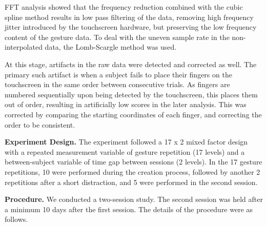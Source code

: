 \documentclass{sig-alternate-10pt}
\begin{document}
FFT analysis showed that the frequency reduction combined with the cubic spline method results in low pass filtering of the data, removing high frequency jitter introduced by the touchscreen hardware, but preserving the low frequency content of the gesture data. To deal with the uneven sample rate in the non-interpolated data, the Lomb-Scargle method was used. 



At this stage, artifacts in the raw data were detected and corrected as well. The primary such artifact is when a subject fails to place their fingers on the touchscreen in the same order between consecutive trials. As fingers are numbered sequentially upon being detected by the touchscreen, this places them out of order, resulting in artificially low scores in the later analysis. This was corrected by comparing the starting coordinates of each finger, and correcting the order to be consistent. 













\textbf{Experiment Design.} The experiment followed a 17 x 2 mixed factor design with a repeated measurement variable of gesture repetition (17 levels) and a between-subject variable of time gap between sessions (2 levels). In the 17 gesture repetitions, 10 were performed during the creation process, followed  by another 2 repetitions after a short distraction, and 5 were performed in the second session.





\textbf{Procedure.} We conducted a two-session study. The second session was held after a minimum 10 days after the first session. The details of the procedure were as follows.
\end{document}
